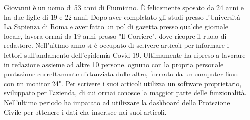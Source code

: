 Giovanni è un uomo di 53 anni di Fiumicino. È felicemente sposato da 24 anni e ha due figlie di 19 e 22 anni.
Dopo aver completato gli studi presso l'Università La Sapienza di Roma e aver fatto un po' di gavetta presso qualche giornale locale, lavora ormai da 19 anni presso "Il Corriere", dove ricopre il ruolo di redattore. Nell'ultimo anno si è occupato di scrivere articoli per informare i lettori sull'andamento dell'epidemia Covid-19. Ultimamente ha ripreso a lavorare in redazione assieme ad altre 10 persone, ognuno con la propria personale postazione correttamente distanziata dalle altre, formata da un computer fisso con un monitor 24".
Per scrivere i suoi articoli utilizza un software proprietario, sviluppato per l'azienda, di cui ormai conosce la maggior parte delle funzionalità. Nell'ultimo periodo ha imparato ad utilizzare la dashboard della Protezione Civile per ottenere i dati che inserisce nei suoi articoli.



